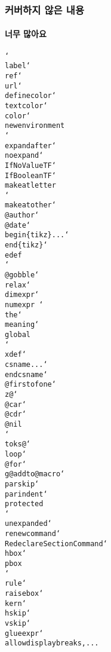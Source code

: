 \begin{frame}[fragile]
  \frametitle{커버하지 않은 내용}
  \framesubtitle{너무 많아요}
  \texttt{\char`\\label\char`\\ref\char`\\url\char`\\definecolor\char`\\textcolor\char`\\color\char`\\newenvironment\\\char`\\expandafter\char`\\noexpand\char`\\IfNoValueTF\char`\\IfBooleanTF\char`\\makeatletter\\\char`\\makeatother\char`\\@author\char`\\@date\char`\\begin\{tikz\}...\char`\\end\{tikz\}\char`\\edef\\\char`\\@gobble\char`\\relax\char`\\dimexpr\char`\\numexpr
  \char`\\the\char`\\meaning\char`\\global\\\char`\\xdef\char`\\csname...\char`\\endcsname\char`\\@firstofone\char`\\z@\char`\\@car\char`\\@cdr\char`\\@nil\\\char`\\toks@\char`\\loop\char`\\@for\char`\\g@addto@macro\char`\\parskip\char`\\parindent\char`\\protected\\ \char`\\unexpanded\char`\\renewcommand\char`\\RedeclareSectionCommand\char`\\hbox\char`\\pbox\\\char`\\rule\char`\\raisebox\char`\\kern\char`\\hskip\char`\\vskip\char`\\glueexpr\char`\\allowdisplaybreaks,...}


\end{frame}
